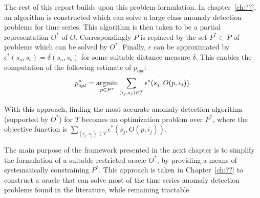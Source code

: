 The rest of this report builds upon this problem formulation. In chapter~\ref{ch:??}, an algorithm is constructed which can solve a large class anomaly detection problems for time series. This algorithm is then taken to be a partial representation $O^*$ of $O$. Correspondingly $P$ is replaced by the set $P^* \subset P$ of problems which can be solved by $O^*$. Finally, $\epsilon$ can be approximated by $\epsilon^*(s_a, s_b) = \delta(s_a, s_b)$ for some suitable distance measure $\delta$. This enables the computation of the following estimate of $p_{opt}$:
\[
    p^*_{opt} = \argmin_{p \in P^*} \sum_{(i_j, s_j) \in T} \epsilon^*(s_j, O(p, i_j)).
\]

With this approach, finding the most accurate anomaly detection algorithm (supported by $O^*$) for $T$ becomes an optimization problem over $P^*$, where the objective function is $\sum_{(i_j, s_j) \in T} \epsilon^*(s_j, O(p, i_j))$.

The main purpose of the framework presented in the next chapter is to simplify the formulation of a suitable restricted oracle $O^*$, by providing a means of systematically constraining $P^*$. This approach is taken in Chapter~\ref{ch:??} to construct a oracle that can solve most of the time series anomaly detection problems found in the literature, while remaining tractable.
